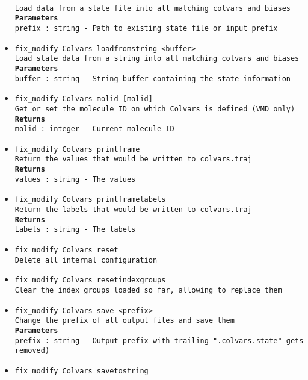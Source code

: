 \begin{itemize}
\\
\texttt{Load data from a state file into all matching colvars and biases}
\\
\texttt{\textbf{Parameters}}
\\
\texttt{prefix : string - Path to existing state file or input prefix}
\item \texttt{fix\_modify Colvars loadfromstring <buffer>}
\\
\texttt{Load state data from a string into all matching colvars and biases}
\\
\texttt{\textbf{Parameters}}
\\
\texttt{buffer : string - String buffer containing the state information}
\item \texttt{fix\_modify Colvars molid [molid]}
\\
\texttt{Get or set the molecule ID on which Colvars is defined (VMD only)}
\\
\texttt{\textbf{Returns}}
\\
\texttt{molid : integer - Current molecule ID}
\item \texttt{fix\_modify Colvars printframe}
\\
\texttt{Return the values that would be written to colvars.traj}
\\
\texttt{\textbf{Returns}}
\\
\texttt{values : string - The values}
\item \texttt{fix\_modify Colvars printframelabels}
\\
\texttt{Return the labels that would be written to colvars.traj}
\\
\texttt{\textbf{Returns}}
\\
\texttt{Labels : string - The labels}
\item \texttt{fix\_modify Colvars reset}
\\
\texttt{Delete all internal configuration}
\item \texttt{fix\_modify Colvars resetindexgroups}
\\
\texttt{Clear the index groups loaded so far, allowing to replace them}
\item \texttt{fix\_modify Colvars save <prefix>}
\\
\texttt{Change the prefix of all output files and save them}
\\
\texttt{\textbf{Parameters}}
\\
\texttt{prefix : string - Output prefix with trailing ".colvars.state" gets removed)}
\item \texttt{fix\_modify Colvars savetostring}

\end{itemize}
